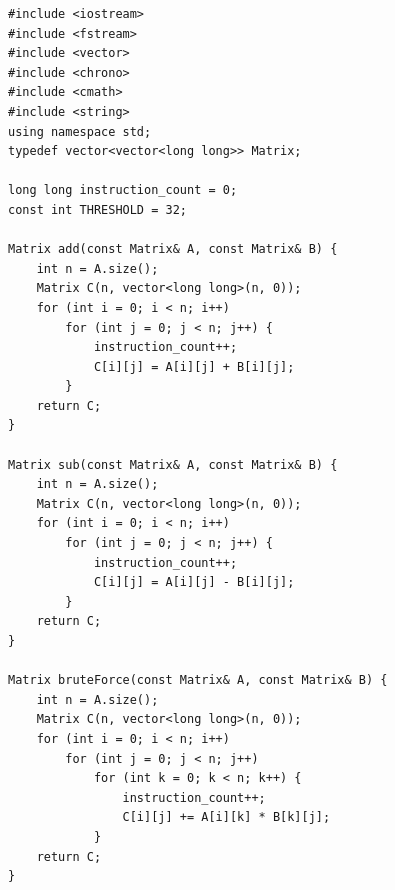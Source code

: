 \documentclass[12pt,a4paper]{article}
\begin{document}
\begin{lstlisting}[style=cppstyle,
    caption={C\'odigo completo de \texttt{strassen.cpp}},
    label={lst:strassen}]
#include <iostream>
#include <fstream>
#include <vector>
#include <chrono>
#include <cmath>
#include <string>
using namespace std;
typedef vector<vector<long long>> Matrix;

long long instruction_count = 0;
const int THRESHOLD = 32;

Matrix add(const Matrix& A, const Matrix& B) {
    int n = A.size();
    Matrix C(n, vector<long long>(n, 0));
    for (int i = 0; i < n; i++)
        for (int j = 0; j < n; j++) {
            instruction_count++;
            C[i][j] = A[i][j] + B[i][j];
        }
    return C;
}

Matrix sub(const Matrix& A, const Matrix& B) {
    int n = A.size();
    Matrix C(n, vector<long long>(n, 0));
    for (int i = 0; i < n; i++)
        for (int j = 0; j < n; j++) {
            instruction_count++;
            C[i][j] = A[i][j] - B[i][j];
        }
    return C;
}

Matrix bruteForce(const Matrix& A, const Matrix& B) {
    int n = A.size();
    Matrix C(n, vector<long long>(n, 0));
    for (int i = 0; i < n; i++)
        for (int j = 0; j < n; j++)
            for (int k = 0; k < n; k++) {
                instruction_count++;
                C[i][j] += A[i][k] * B[k][j];
            }
    return C;
}


\end{lstlisting}
\end{document}
